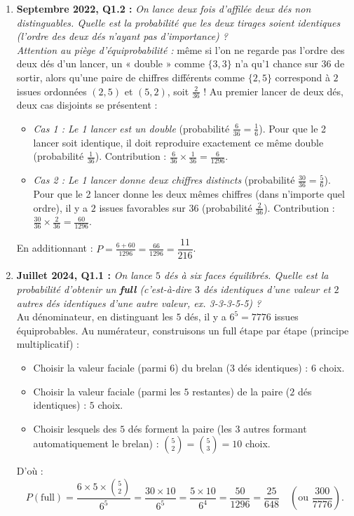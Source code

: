 \begin{exemple}
\begin{enumerate}
    \item \textbf{Septembre 2022, Q1.2 :} \emph{On lance deux fois d'affilée deux dés non distinguables. Quelle est la probabilité que les deux tirages soient identiques (l'ordre des deux dés n'ayant pas d'importance) ?}\\
    \emph{Attention au piège d'équiprobabilité :} même si l'on ne regarde pas l'ordre des deux dés d'un lancer, un « double » comme $\{3, 3\}$ n'a qu'$1$ chance sur $36$ de sortir, alors qu'une paire de chiffres différents comme $\{2, 5\}$ correspond à $2$ issues ordonnées $(2,5)$ et $(5,2)$, soit $\frac{2}{36}$ !
    Au premier lancer de deux dés, deux cas disjoints se présentent :
    \begin{itemize}
        \item \emph{Cas 1 : Le 1\ier{} lancer est un double} (probabilité $\frac{6}{36} = \frac{1}{6}$). Pour que le 2\ieme{} lancer soit identique, il doit reproduire exactement ce même double (probabilité $\frac{1}{36}$). Contribution : $\frac{6}{36} \times \frac{1}{36} = \frac{6}{1296}$.
        \item \emph{Cas 2 : Le 1\ier{} lancer donne deux chiffres distincts} (probabilité $\frac{30}{36} = \frac{5}{6}$). Pour que le 2\ieme{} lancer donne les deux mêmes chiffres (dans n'importe quel ordre), il y a $2$ issues favorables sur $36$ (probabilité $\frac{2}{36}$). Contribution : $\frac{30}{36} \times \frac{2}{36} = \frac{60}{1296}$.
    \end{itemize}
    En additionnant : $P = \frac{6 + 60}{1296} = \frac{66}{1296} = \boxed{\dfrac{11}{216}}$.

    \item \textbf{Juillet 2024, Q1.1 :} \emph{On lance $5$ dés à six faces équilibrés. Quelle est la probabilité d'obtenir un \textbf{full} (c'est-à-dire $3$ dés identiques d'une valeur et $2$ autres dés identiques d'une autre valeur, ex. 3-3-3-5-5) ?}\\
    Au dénominateur, en distinguant les $5$ dés, il y a $6^5 = 7776$ issues équiprobables.
    Au numérateur, construisons un full étape par étape (principe multiplicatif) :
    \begin{itemize}
        \item Choisir la valeur faciale (parmi $6$) du brelan ($3$ dés identiques) : $6$ choix.
        \item Choisir la valeur faciale (parmi les $5$ restantes) de la paire ($2$ dés identiques) : $5$ choix.
        \item Choisir lesquels des $5$ dés forment la paire (les $3$ autres formant automatiquement le brelan) : $\binom{5}{2} = \binom{5}{3} = 10$ choix.
    \end{itemize}
    D'où :
    \[
        P(\text{full}) = \frac{6 \times 5 \times \binom{5}{2}}{6^5} = \frac{30 \times 10}{6^5} = \frac{5 \times 10}{6^4} = \frac{50}{1296} = \boxed{\frac{25}{648}} \quad \left(\text{ou } \frac{300}{7776}\right).
    \]


\end{enumerate}
\end{exemple}

